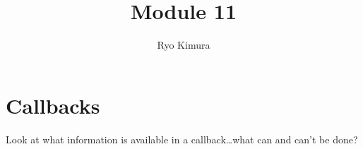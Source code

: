 \documentclass[12pt]{article}
\begin{document}
\title{Module 11}
\author{Ryo Kimura}
\date{}
\maketitle

\section{Callbacks}

Look at what information is available in a callback\ldots what can and can't be done?
\end{document}
